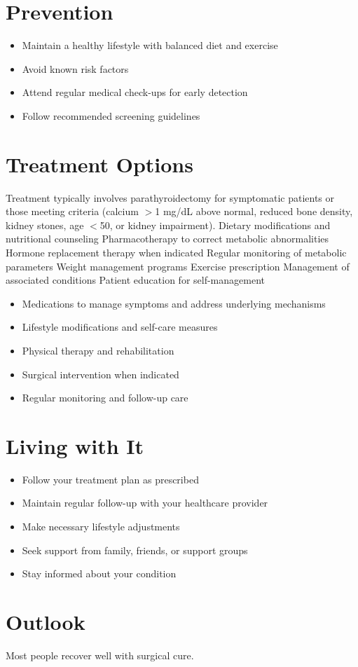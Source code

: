 \section{Prevention}
\begin{itemize}[noitemsep]
  \item Maintain a healthy lifestyle with balanced diet and exercise
  \item Avoid known risk factors
  \item Attend regular medical check-ups for early detection
  \item Follow recommended screening guidelines
\end{itemize}
\section{Treatment Options}
Treatment typically involves parathyroidectomy for symptomatic patients or those meeting criteria (calcium $>$1 mg/dL above normal, reduced bone density, kidney stones, age $<$50, or kidney impairment). Dietary modifications and nutritional counseling Pharmacotherapy to correct metabolic abnormalities Hormone replacement therapy when indicated Regular monitoring of metabolic parameters Weight management programs Exercise prescription Management of associated conditions Patient education for self-management

\begin{itemize}[noitemsep]
  \item Medications to manage symptoms and address underlying mechanisms
  \item Lifestyle modifications and self-care measures
  \item Physical therapy and rehabilitation
  \item Surgical intervention when indicated
  \item Regular monitoring and follow-up care
\end{itemize}
\section{Living with It}
\begin{itemize}[noitemsep]
  \item Follow your treatment plan as prescribed
  \item Maintain regular follow-up with your healthcare provider
  \item Make necessary lifestyle adjustments
  \item Seek support from family, friends, or support groups
  \item Stay informed about your condition
\end{itemize}
\section{Outlook}
Most people recover well with surgical cure.
